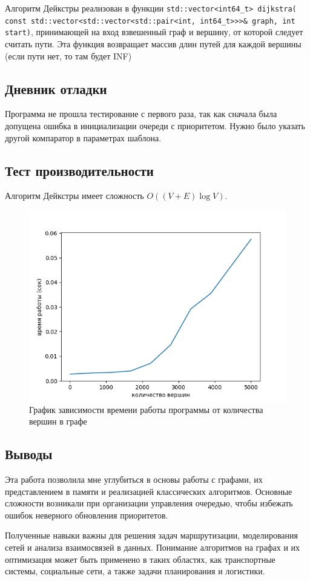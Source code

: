 \documentclass[12pt]{article}
\begin{document}
Алгоритм Дейкстры реализован в функции 
\texttt{std::vector<int64\_t> dijkstra(
    const std::vector<std::vector<std::pair<int, int64\_t>>>\& graph, int start)},
принимающей на вход взвешенный граф и вершину, от которой следует считать пути.
Эта функция возвращает массив длин путей для каждой вершины (если пути нет, то там будет INF)

\subsection*{Дневник отладки}

Программа не прошла тестирование с первого раза, так как сначала была допущена ошибка в инициализации
очереди с приоритетом. Нужно было указать другой компаратор в параметрах шаблона.

\newpage
\subsection*{Тест производительности}

Алгоритм Дейкстры имеет сложность $O((V + E) \log V)$.
\begin{figure}
    \centering
    \includegraphics[width=\textwidth]{graph.png}
    \caption{График зависимости времени работы программы от количества вершин в графе}
\end{figure}

\subsection*{Выводы}

Эта работа позволила мне углубиться в основы работы с графами,
их представлением в памяти и реализацией классических алгоритмов.
Основные сложности возникали при организации управления очередью,
чтобы избежать ошибок неверного обновления приоритетов.

Полученные навыки важны для решения задач маршрутизации,
моделирования сетей и анализа взаимосвязей в данных.
Понимание алгоритмов на графах и их оптимизация
может быть применено в таких областях, как транспортные системы,
социальные сети, а также задачи планирования и логистики.
\end{document}
